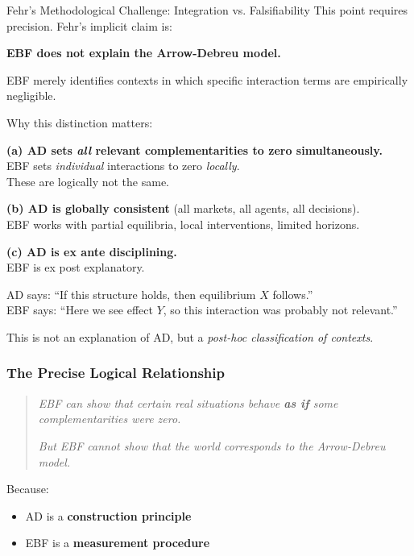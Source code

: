 \begin{chapter}{Fehr's Methodological Challenge: Integration vs. Falsifiability}
This point requires precision. Fehr's implicit claim is:

\begin{tcolorbox}[colback=yellow!5!white,colframe=yellow!75!black,title=\textbf{What EBF Actually Does (and Does Not Do)}]
\textbf{EBF does not explain the Arrow-Debreu model.}

EBF merely identifies contexts in which specific interaction terms are empirically negligible.
\end{tcolorbox}

Why this distinction matters:

\textbf{(a) AD sets \textit{all} relevant complementarities to zero simultaneously.}\\
EBF sets \textit{individual} interactions to zero \textit{locally}.\\
These are logically not the same.

\textbf{(b) AD is globally consistent} (all markets, all agents, all decisions).\\
EBF works with partial equilibria, local interventions, limited horizons.

\textbf{(c) AD is ex ante disciplining.}\\
EBF is ex post explanatory.

AD says: ``If this structure holds, then equilibrium $X$ follows.''\\
EBF says: ``Here we see effect $Y$, so this interaction was probably not relevant.''

This is not an explanation of AD, but a \textit{post-hoc classification of contexts}.

\subsubsection{The Precise Logical Relationship}

\begin{quote}
\textit{EBF can show that certain real situations behave \textbf{as if} some complementarities were zero.}

\textit{But EBF cannot show that the world corresponds to the Arrow-Debreu model.}
\end{quote}

Because:
\begin{itemize}[noitemsep]
    \item AD is a \textbf{construction principle}
    \item EBF is a \textbf{measurement procedure}
\end{itemize}


\end{chapter}
